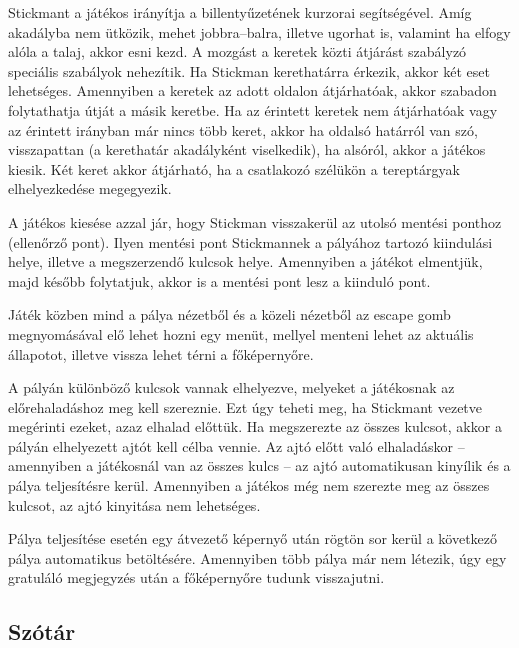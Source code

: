 	Stickmant a játékos irányítja a billentyűzetének kurzorai segítségével. Amíg akadályba nem ütközik, mehet jobbra--balra, illetve ugorhat is, valamint ha elfogy alóla a talaj, akkor esni kezd. A mozgást a keretek közti átjárást szabályzó speciális szabályok nehezítik. Ha Stickman kerethatárra érkezik, akkor két eset lehetséges. Amennyiben a keretek az adott oldalon átjárhatóak, akkor szabadon folytathatja útját a másik keretbe. Ha az érintett keretek nem átjárhatóak vagy az érintett irányban már nincs több keret, akkor ha oldalsó határról van szó, visszapattan (a kerethatár akadályként viselkedik), ha alsóról, akkor a játékos kiesik. Két keret akkor átjárható, ha a csatlakozó szélükön a tereptárgyak elhelyezkedése megegyezik.
	
	A játékos kiesése azzal jár, hogy Stickman visszakerül az utolsó mentési ponthoz (ellenőrző pont). Ilyen mentési pont Stickmannek a pályához tartozó kiindulási helye, illetve a megszerzendő kulcsok helye. Amennyiben a játékot elmentjük, majd később folytatjuk, akkor is a mentési pont lesz a kiinduló pont.
	
	Játék közben mind a pálya nézetből és a közeli nézetből az escape gomb megnyomásával elő lehet hozni egy menüt, mellyel menteni lehet az aktuális állapotot, illetve vissza lehet térni a főképernyőre.
	
	A pályán különböző kulcsok vannak elhelyezve, melyeket a játékosnak az előrehaladáshoz meg kell szereznie. Ezt úgy teheti meg, ha Stickmant vezetve megérinti ezeket, azaz elhalad előttük. Ha megszerezte az összes kulcsot, akkor a pályán elhelyezett ajtót kell célba vennie. Az ajtó előtt való elhaladáskor -- amennyiben a játékosnál van az összes kulcs -- az ajtó automatikusan kinyílik és a pálya teljesítésre kerül. Amennyiben a játékos még nem szerezte meg az összes kulcsot, az ajtó kinyitása nem lehetséges.
	
	Pálya teljesítése esetén egy átvezető képernyő után rögtön sor kerül a következő pálya automatikus betöltésére. Amennyiben több pálya már nem létezik, úgy egy gratuláló megjegyzés után a főképernyőre tudunk visszajutni.

\subsection{Szótár}

